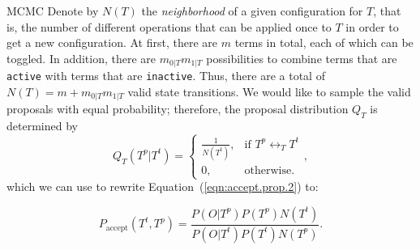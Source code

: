 \documentclass{beamer}
\newcommand{\numberofterms}[2][|T]{m_{#2#1}}
\begin{document}
\begin{frame}{MCMC}
 Denote by $N(T)$ the \emph{neighborhood} of a given configuration for
$T$, that is, the number of different operations that can be applied
once to $T$ in order to get a new configuration. At first, there are
$m$ terms in total, each of which can be toggled. In addition, there
are $\numberofterms{0}\numberofterms{1}$ possibilities to combine
terms that are \texttt{active} with terms that are \texttt{inactive}.
Thus, there are a total of $N(T)=m+\numberofterms{0}\numberofterms{1}$
valid state transitions. We would like to sample the valid proposals
with equal probability; therefore, the proposal distribution $Q_T$ is
determined by
\begin{equation}
 Q_T(T^p|T^t)=\begin{cases}
                  \frac{1}{N(T^t)}, & \text{if } T^p \leftrightarrow_T
                  T^t\\ 0, & \text{otherwise.}
               \end{cases},
\end{equation}
which we can use to rewrite Equation~(\ref{eqn:accept.prop.2}) to:

\newcommand{\acceptratio}{\frac{P(O|T^{p})P(T^{p})N(T^t)}{P(O|T^{t})P(T^{t})N(T^p)}}
\begin{equation*}
 P_{\text{accept}}(T^t,T^p) = 
 \acceptratio.
\label{eqn:accept.prop.3}
\end{equation*}
\end{frame}

\end{document}
